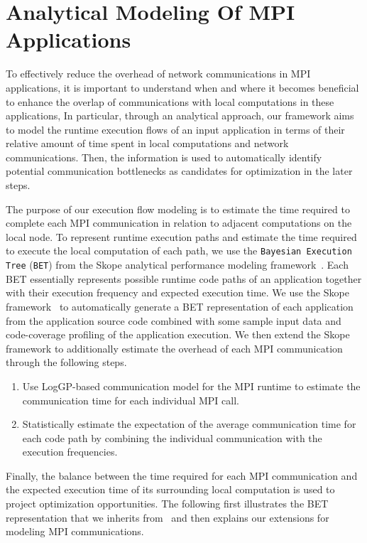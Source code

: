\section{Analytical Modeling Of MPI Applications}
\label{sec-model}

To effectively reduce the overhead of network communications in MPI applications,
it is important to understand when and where it becomes beneficial to enhance the overlap of communications with local computations in these applications,
In particular, through an analytical approach, our framework aims to model the runtime execution flows of an input application in terms of their relative amount of time spent in local computations and network communications.
Then, the information is used to automatically identify potential communication bottlenecks as candidates for optimization in the later steps.

The purpose of our execution flow modeling is to estimate the time required to complete each MPI communication in relation to adjacent computations on the local node.
To represent runtime execution paths and estimate the time required to execute the local computation of each path, we use the  \texttt{Bayesian Execution Tree} (\texttt{BET})  from the Skope analytical performance modeling framework~\cite{jichi:ipdps14}.
Each BET essentially represents possible runtime code paths of an application together with their execution frequency and expected execution time. We use the Skope framework~\cite{jichi:ipdps14} to automatically generate a BET representation of each application from the application source code combined with some sample input data and code-coverage  profiling of the application execution.
We then extend the Skope framework to additionally estimate the overhead of each MPI communication through the following steps.
\begin{enumerate}
\item Use LogGP-based communication model for the MPI runtime to estimate the communication time for each individual MPI call.
\item Statistically estimate the expectation of the average communication time for each code path by combining the individual communication with the execution frequencies.
\end{enumerate}
Finally, the balance between the time required for each MPI communication and the expected execution time of its surrounding local computation is used to project optimization opportunities. The following first illustrates the BET representation that we inherits from~\cite{jichi:ipdps14} and then explains our extensions for modeling MPI communications.

